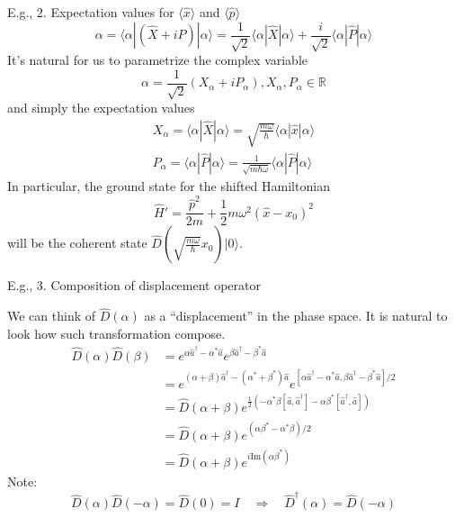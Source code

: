 E.g., 2. Expectation values for $\langle \hat{x}\rangle$ and $\langle \hat{p}\rangle$
\[ \alpha =\langle \alpha |\left( \hat{X}+i\hat{P} \right) |\alpha \rangle =\frac{1}{\sqrt{2}}\langle \alpha |\hat{X}|\alpha \rangle +\frac{i}{\sqrt{2}}\langle \alpha |\hat{P}|\alpha \rangle \]
It's natural for us to parametrize the complex variable
\[ \alpha =\frac{1}{\sqrt{2}}\left( X_{\alpha}+iP_{\alpha} \right) ,X_{\alpha},P_{\alpha}\in \mathbb{R} \]
and simply the expectation values
\begin{gather*}
    X_{\alpha}=\langle \alpha |\hat{X}|\alpha \rangle =\sqrt{\frac{m\omega}{\hbar}}\langle \alpha |\hat{x}|\alpha \rangle \\
    P_{\alpha}=\langle \alpha |\hat{P}|\alpha \rangle =\frac{1}{\sqrt{m\hbar \omega}}\langle \alpha |\hat{P}|\alpha \rangle
\end{gather*}
In particular, the ground state for the shifted Hamiltonian
\[ \hat{H}'=\frac{\hat{p}^2}{2m}+\frac{1}{2}m\omega ^2\left( \hat{x}-x_0 \right) ^2\]
will be the coherent state $\hat{D}(\sqrt{\frac{m\omega}{\hbar}}x_0)|0\rangle$.

E.g., 3. Composition of displacement operator

We can think of $\hat{D}(\alpha)$ as a ``displacement'' in the phase space. It is natural to look how such transformation compose.
\begin{align*}
    \hat{D}\left( \alpha \right) \hat{D}\left( \beta \right) &=e^{\alpha \hat{a}^{\dagger}-\alpha ^*\hat{a}}e^{\beta \hat{a}^{\dagger}-\beta ^*\hat{a}}\\
    &=e^{\left( \alpha +\beta \right) \hat{a}^{\dagger}-\left( \alpha ^*+\beta ^* \right) \hat{a}}e^{\left[ \alpha \hat{a}^{\dagger}-\alpha ^*\hat{a},\beta \hat{a}^{\dagger}-\beta ^*\hat{a} \right] /2}\\
    &=\hat{D}\left( \alpha +\beta \right) e^{\frac{1}{2}\left( -\alpha ^*\beta \left[ \hat{a},\hat{a}^{\dagger} \right] -\alpha \beta ^*\left[ \hat{a}^{\dagger},\hat{a} \right] \right)}\\
    &=\hat{D}\left( \alpha +\beta \right) e^{\left( \alpha \beta ^*-\alpha ^*\beta \right) /2}\\
    &=\hat{D}\left( \alpha +\beta \right) e^{i\mathrm{Im}\left( \alpha \beta ^* \right)}
\end{align*}
Note:
\[ \hat{D}\left( \alpha \right) \hat{D}\left( -\alpha \right) =\hat{D}\left( 0 \right) =I\quad \Rightarrow \quad \hat{D}^{\dagger}\left( \alpha \right) =\hat{D}\left( -\alpha \right) \]

